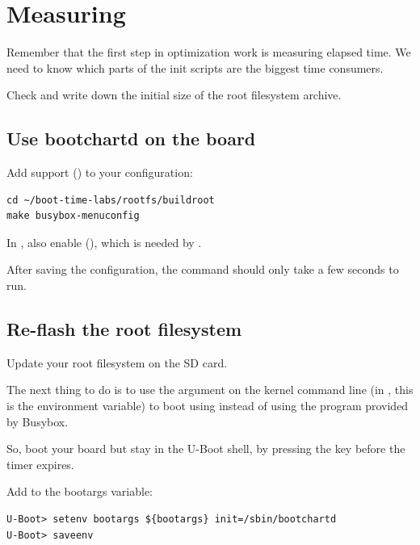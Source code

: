 
\section{Measuring}

Remember that the first step in optimization work is measuring elapsed
time. We need to know which parts of the init scripts are the biggest
time consumers.

Check and write down the initial size of the root filesystem archive.

\subsection{Use bootchartd on the board}

Add  support ()
to your  configuration:

\begin{verbatim}
cd ~/boot-time-labs/rootfs/buildroot
make busybox-menuconfig
\end{verbatim}

In , also enable  (), which is needed by
.

After saving the configuration, the  command should only take
a few seconds to run.

\subsection{Re-flash the root filesystem}

Update your root filesystem on the SD card.

The next thing to do is to use the  argument on the
kernel command line (in , this is the 
environment variable) to boot using  instead of using
the  program provided by Busybox.

So, boot your board but stay in the U-Boot shell, by pressing the
 key before the timer expires.

Add  to the bootargs variable:
\begin{verbatim}
U-Boot> setenv bootargs ${bootargs} init=/sbin/bootchartd
U-Boot> saveenv
\end{verbatim}

